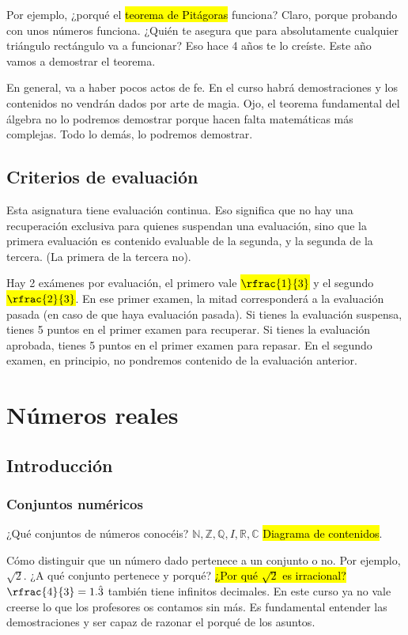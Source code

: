 \documentclass[palatino,nosec]{Docencia}
\begin{document}
Por ejemplo, ¿porqué el \hl{teorema de Pitágoras} funciona? 
%
Claro, porque probando con unos números funciona. 
%
¿Quién te asegura que para absolutamente cualquier triángulo rectángulo va a funcionar? Eso hace 4 años te lo creíste. 
%
Este año vamos a demostrar el teorema.

En general, va a haber pocos actos de fe. 
%
En el curso habrá demostraciones y los contenidos no vendrán dados por arte de magia. 
%
Ojo, el teorema fundamental del álgebra no lo podremos demostrar porque hacen falta matemáticas más complejas. 
%
Todo lo demás, lo podremos demostrar.

\subsection{Criterios de evaluación}

Esta asignatura tiene evaluación continua. Eso significa que no hay una recuperación exclusiva para quienes suspendan una evaluación, sino que la primera evaluación es contenido evaluable de la segunda, y la segunda de la tercera.
%
(La primera de la tercera no).

Hay 2 exámenes por evaluación, el primero vale \hl{$\rfrac{1}{3}$} y el segundo \hl{$\rfrac{2}{3}$}. 
%
En ese primer examen, la mitad corresponderá a la evaluación pasada (en caso de que haya evaluación pasada).
%
Si tienes la evaluación suspensa, tienes 5 puntos en el primer examen para recuperar.
%
Si tienes la evaluación aprobada, tienes 5 puntos en el primer examen para repasar.
%
En el segundo examen, en principio, no pondremos contenido de la evaluación anterior.


\section{Números reales}

\subsection{Introducción}

\subsubsection{Conjuntos numéricos}

¿Qué conjuntos de números conocéis? $ℕ,ℤ,ℚ,I,ℝ,ℂ$ \hl{Diagrama de contenidos}.

Cómo distinguir que un número dado pertenece a un conjunto o no.
%
Por ejemplo, $\sqrt{2}$. ¿A qué conjunto pertenece y porqué?
%
\hl{¿Por qué $\sqrt{2}$ es irracional?} $\rfrac{4}{3} = 1.\hat{3}$ también tiene infinitos decimales.
%
En este curso ya no vale creerse lo que los profesores os contamos sin más. Es fundamental entender las demostraciones y ser capaz de razonar el porqué de los asuntos.
\end{document}
